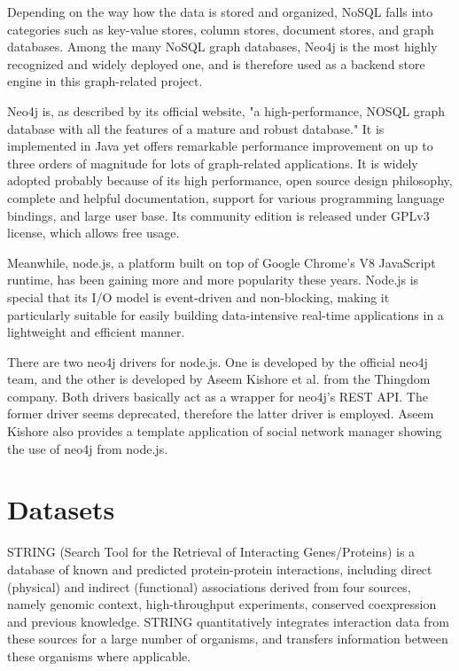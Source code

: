 \documentclass[10pt,conference,compsocconf]{IEEEtran}
\begin{document}
Depending on the way how the data is stored and organized, NoSQL falls into categories such as key-value stores, column stores, document stores, and graph databases. Among the many NoSQL graph databases, Neo4j \citep{1076} is the most highly recognized and widely deployed one, and is therefore used as a backend store engine in this graph-related project.

Neo4j is, as described by its official website, "a high-performance, NOSQL graph database with all the features of a mature and robust database." It is implemented in Java yet offers remarkable performance improvement on up to three orders of magnitude for lots of graph-related applications. It is widely adopted probably because of its high performance, open source design philosophy, complete and helpful documentation, support for various programming language bindings, and large user base. Its community edition is released under GPLv3 license, which allows free usage.

Meanwhile, node.js, a platform built on top of Google Chrome's V8 JavaScript runtime, has been gaining more and more popularity these years. Node.js is special that its I/O model is event-driven and non-blocking, making it particularly suitable for easily building data-intensive real-time applications in a lightweight and efficient manner. 

There are two neo4j drivers for node.js. One is developed by the official neo4j team, and the other is developed by Aseem Kishore et al. from the Thingdom company. Both drivers basically act as a wrapper for neo4j's REST API. The former driver seems deprecated, therefore the latter driver is employed. Aseem Kishore also provides a template application of social network manager showing the use of neo4j from node.js.

\section{Datasets}

STRING (Search Tool for the Retrieval of Interacting Genes/Proteins) \citep{1070,1071,1072,1073,1074,1075} is a database of known and predicted protein-protein interactions, including direct (physical) and indirect (functional) associations derived from four sources, namely genomic context, high-throughput experiments, conserved coexpression and previous knowledge. STRING quantitatively integrates interaction data from these sources for a large number of organisms, and transfers information between these organisms where applicable.
\end{document}
